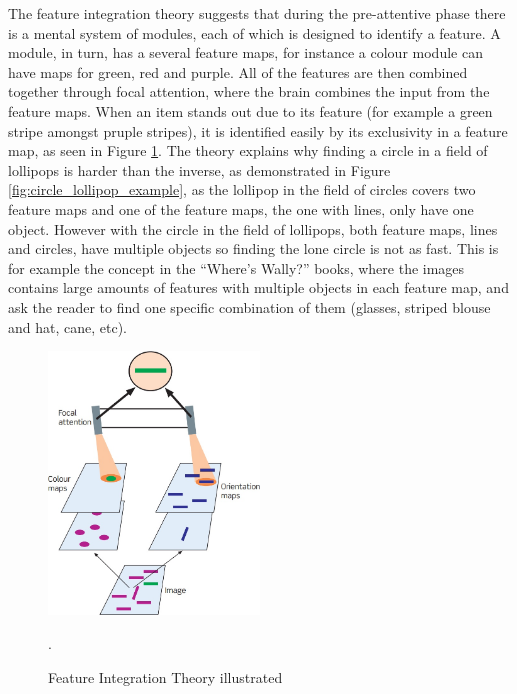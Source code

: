 The feature integration theory suggests that during the pre-attentive phase there is a mental system of modules, each of which is designed to identify a feature. A module, in turn, has a several feature maps, for instance a colour module can have maps for green, red and purple. All of the features are then combined together through focal attention, where the brain combines the input from the feature maps. When an item stands out due to its feature (for example a green stripe amongst pruple stripes), it is identified easily by its exclusivity in a feature map, as seen in Figure \ref{fig:feature_integration_theory}. The theory explains why finding a circle in a field of lollipops is harder than the inverse, as demonstrated in Figure \ref{fig:circle_lollipop_example}, as the lollipop in the field of circles covers two feature maps and one of the feature maps, the one with lines, only have one object. However with the circle in the field of lollipops, both feature maps, lines and circles, have multiple objects so finding the lone circle is not as fast. This is for example the concept in the “Where’s Wally?” books, where the images contains large amounts of features with multiple objects in each feature map, and ask the reader to find one specific combination of them (glasses, striped blouse and hat, cane, etc)\cite{snowden2012basic}.

\begin{figure}[h!]
	\centering
	\includegraphics[width=0.5\textwidth]{figures/feature_integration_theory.jpg}
	\caption{Feature Integration Theory illustrated \cite{snowden2012basic}}.\label{fig:feature_integration_theory}
\end{figure}

